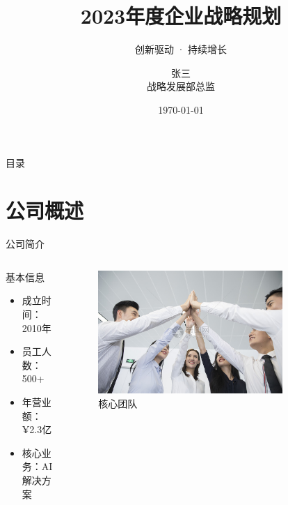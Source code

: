 \documentclass[10pt, aspectratio=169]{beamer} %
\title[企业演示]{2023年度企业战略规划}
\subtitle{创新驱动 · 持续增长}
\author[张三]{张三 \\ 战略发展部总监}
\institute[ABC公司]{ABC科技有限公司}
\date{\today}
\begin{document}
\frame{\titlepage}

\begin{frame}{目录}
    \tableofcontents[hideallsubsections]
\end{frame}

\section{公司概述}
\begin{frame}{公司简介}
    \begin{columns}[T]
        \begin{column}{0.5\textwidth}
            \begin{block}{基本信息}
                \begin{itemize}
                    \item 成立时间：2010年
                    \item 员工人数：500+
                    \item 年营业额：¥2.3亿
                    \item 核心业务：AI解决方案
                \end{itemize}
            \end{block}
        \end{column}
        \begin{column}{0.5\textwidth}
            \begin{figure}
                \centering
                \includegraphics[width=0.8\textwidth]{images/example-image-team.jpg} %
                \caption{核心团队}
            \end{figure}
        \end{column}
    \end{columns}
\end{frame}
\end{document}
